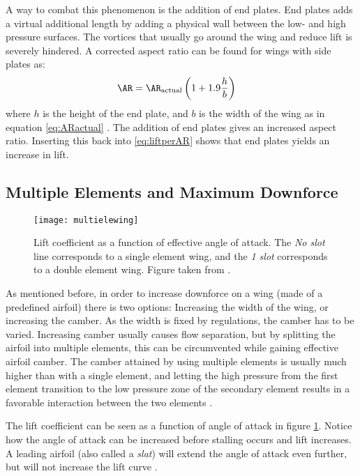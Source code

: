     A way to combat this phenomenon is the addition of end plates. End plates adds a virtual additional length by adding a physical wall between the low- and high pressure surfaces. The vortices that usually go around the wing and reduce lift is severely hindered. A corrected aspect ratio can be found for wings with side plates as:
    \begin{align}
      \AR &= \AR_\text{actual}\left(1+1.9\frac{h}{b}\right) \label{eq:endplates}
    \end{align}
    where $h$ is the height of the end plate, and $b$ is the width of the wing as in equation \ref{eq:ARactual} \cite{jkatz}. The addition of end plates gives an increased aspect ratio. Inserting this back into \ref{eq:liftperAR} shows that end plates yields an increase in lift.

    \subsection{Multiple Elements and Maximum Downforce}
      \begin{figure}[ht]
        \texttt{[image: multielewing]}
        \caption{Lift coefficient as a function of effective angle of attack. The \emph{No slot} line corresponds to a single element wing, and the \emph{1 slot} corresponds to a double element wing. Figure taken from \cite{jkatz}.}
        \label{fig:multielewing}
      \end{figure}

      As mentioned before, in order to increase downforce on a wing (made of a predefined airfoil) there is two options: Increasing the width of the wing, or increasing the camber. As the width is fixed by regulations, the camber has to be varied. Increasing camber usually causes flow separation, but by splitting the airfoil into multiple elements, this can be circumvented while gaining effective airfoil camber. The camber attained by using multiple elements is usually much higher than with a single element, and letting the high pressure from the first element transition to the low pressure zone of the secondary element results in a favorable interaction between the two elements .

      The lift coefficient can be seen as a function of angle of attack in figure \ref{fig:multielewing}. Notice how the angle of attack can be increased before stalling occurs and lift increases. A leading airfoil (also called a \emph{slat}) will extend the angle of attack even further, but will not increase the lift curve \cite{jkatz}.

